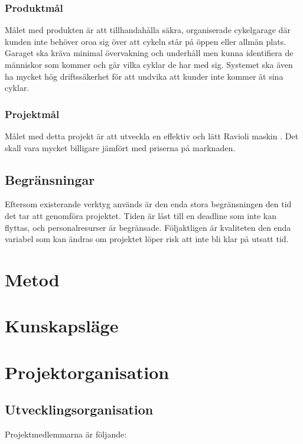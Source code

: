 \documentclass[a4paper]{article}
\begin{document}
\subsubsection{Produktmål}
Målet med produkten är att tillhandahålla säkra, organiserade cykelgarage där kunden inte behöver oroa 
sig över att cykeln står på öppen eller allmän plats. Garaget ska kräva minimal övervakning och underhåll men 
kunna identifiera de människor som kommer och går vilka cyklar de har med sig. Systemet ska även ha mycket 
hög driftssäkerhet för att undvika att kunder inte kommer åt sina cyklar.

\subsubsection{Projektmål}
Målet med detta projekt är att utveckla en effektiv och  lätt Ravioli maskin . 
Det skall vara mycket  billigare jämfört med priserna på marknaden. 

\subsection{Begränsningar} %
Eftersom existerande verktyg används är den enda stora begränsningen den tid det tar att genomföra 
projektet. Tiden är låst till en deadline som inte kan flyttas, och personalresurser är begränsade. 
Följaktligen är kvaliteten den enda variabel som kan ändras om projektet löper risk att inte bli klar 
på utsatt tid.


\section{Metod}
\section{Kunskapsläge}

\section{Projektorganisation} %
\subsection{Utvecklingsorganisation} %
Projektmedlemmarna är följande:
\end{document}
